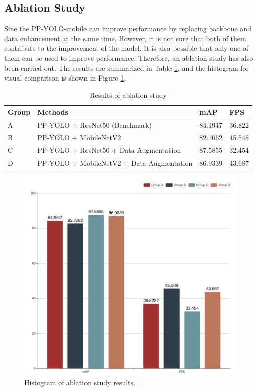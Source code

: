 \documentclass[journal,article,submit,moreauthors,pdftex]{Definitions/mdpi}
\begin{document}
\subsection{Ablation Study}

Sine the PP-YOLO-mobile can improve performance by replacing backbone and data enhancement at the same time. However, it is not sure that both of them contribute to the improvement of the model. It is also possible that only one of them can be used to improve performance. Therefore, an ablation study has also been carried out. The results are summarized in Table \ref{tbl:Results of ablation study}, and the histogram for visual comparison is shown in Figure \ref{fig:ablation-bar}.


\begin{table}[htbp]
\centering
\caption{Results of ablation study}
\begin{tabular}{llll} 
\toprule
\textbf{Group}&\textbf{Methods}&\textbf{mAP}&\textbf{FPS}\\
\midrule
A& PP-YOLO + ResNet50 (Benchmark) &84.1947 & 36.822\\
\cmidrule(r){1-4}
B& PP-YOLO + MobileNetV2 &82.7062 & 45.548\\
C& PP-YOLO + ResNet50 + Data Augmentation & 87.5855 & 32.454\\
D& PP-YOLO + MobileNetV2 + Data Augmentation & 86.9339& 43.687\\
\bottomrule
\end{tabular}
\label{tbl:Results of ablation study}
\end{table}

\begin{figure}[htbp]
\centering
\includegraphics[width=0.8\columnwidth]{images/ablation-bar.png}
\caption{Histogram of ablation study results.}
\label{fig:ablation-bar}
\end{figure}
\end{document}
